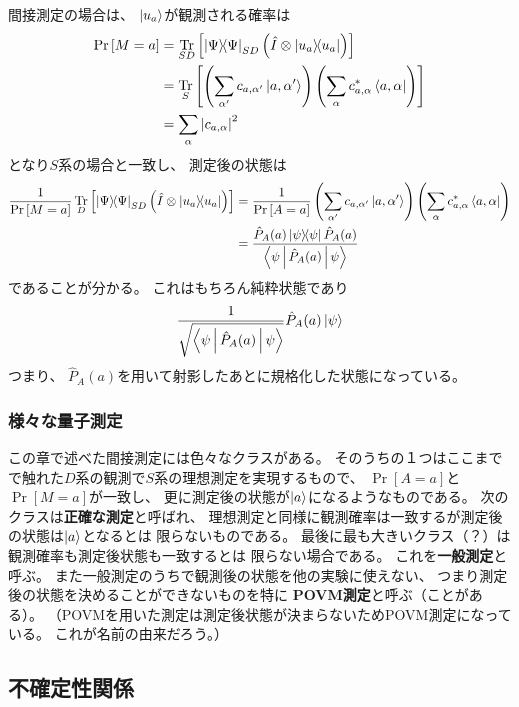 \documentclass[a4paper, 10pt, uplatex]{jsarticle}
\begin{document}
間接測定の場合は、
$\Ket{u_a}$が観測される確率は
\begin{align}
	\Pr \left[ M = a \right]
	&= \operatorname*{Tr}_{SD} \left[ \Ket{\Psi} \! \! \Bra{\Psi}_{SD}
	\left( \hat{I} \otimes \Ket{u_a} \! \! \Bra{u_a} \right) \right] \\
	&= \operatorname*{Tr}_S \left[
		\left( \sum_{\alpha'} c_{a, \alpha'} \Ket{a, \alpha'} \right)
		\left( \sum_\alpha c^*_{a, \alpha} \Bra{a, \alpha} \right)
	 \right] \\
	 &= \sum_\alpha \left| c_{a, \alpha} \right|^2
\end{align}
となり$S$系の場合と一致し、
測定後の状態は
\begin{align}
	\frac{1}{\Pr \left[ M = a \right]}
	\operatorname*{Tr}_D \left[ \Ket{\Psi} \! \! \Bra{\Psi}_{SD}
	\left( \hat{I} \otimes \Ket{u_a} \! \! \Bra{u_a} \right) \right]
	&= \frac{1}{\Pr \left[ A = a \right]}
	\left( \sum_{\alpha'} c_{a, \alpha'} \Ket{a, \alpha'} \right)
	\left( \sum_\alpha c^*_{a, \alpha} \Bra{a, \alpha} \right) \\
	&= \frac{\hat{P}_A (a) \Ket{\psi} \! \! \Bra{\psi} \hat{P}_A (a)}
	{\Braket{\psi | \hat{P}_A (a) | \psi}}
\end{align}
であることが分かる。
これはもちろん純粋状態であり
\begin{align}
	\frac{1}{\sqrt{\Braket{\psi | \hat{P}_A (a) | \psi}}}
	\hat{P}_A (a) \Ket{\psi}
\end{align}
つまり、
$\hat{P}_A (a)$を用いて射影したあとに規格化した状態になっている。

\subsubsection{様々な量子測定}
この章で述べた間接測定には色々なクラスがある。
そのうちの１つはここまでで触れた$D$系の観測で$S$系の理想測定を実現するもので、
$\Pr \left[ A = a \right]$と$\Pr \left[ M = a \right]$が一致し、
更に測定後の状態が$\Ket{a}$になるようなものである。
次のクラスは\textbf{正確な測定}と呼ばれ、
理想測定と同様に観測確率は一致するが測定後の状態は$\Ket{a}$となるとは
限らないものである。
最後に最も大きいクラス（？）は観測確率も測定後状態も一致するとは
限らない場合である。
これを\textbf{一般測定}と呼ぶ。
また一般測定のうちで観測後の状態を他の実験に使えない、
つまり測定後の状態を決めることができないものを特に
\textbf{POVM測定}と呼ぶ（ことがある）。
（POVMを用いた測定は測定後状態が決まらないためPOVM測定になっている。
これが名前の由来だろう。）

\subsection{不確定性関係}
\end{document}
